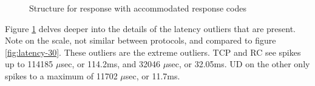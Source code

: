 \begin{figure}
    \centering
    \caption{Structure for response with accommodated response codes}
    \label{fig:latencies_30}
\end{figure}


Figure \ref{fig:latencies_30} delves deeper into the details of the latency outliers that are present.
Note on the scale, not similar between protocols, and compared to figure \ref{fig:latency-30}.
These outliers are the extreme outliers.
TCP and RC see spikes up to 114185 $\mu$sec, or 114.2ms, and 32046 $\mu$sec, or 32.05ms.
UD on the other only spikes to a maximum of 11702 $\mu$sec, or 11.7ms.

